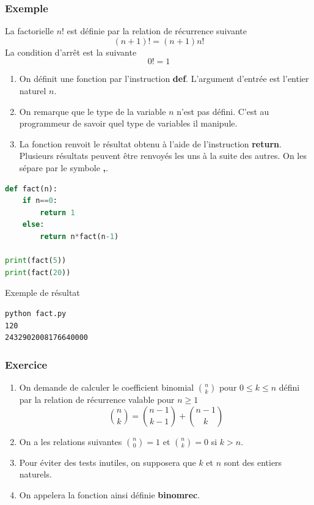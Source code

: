 \documentclass[a4paper,12pt]{article}
\begin{document}
\subsubsection{Exemple}
\begin{leftbar}
La factorielle $n!$ est d\'efinie par la relation de  r\'ecurrence suivante
\begin{equation*}
(n+1)!=(n+1)n!
\end{equation*}
La condition d'arr\^et est la suivante
\begin{equation*}
0!=1
\end{equation*}
\end{leftbar}
\begin{enumerate}
\item On définit une fonction par l'instruction \textbf{def}. L'argument d'entrée est l'entier naturel $n$.
\item On remarque que le type de la variable $n$ n'est pas défini. C'est au programmeur de savoir quel type de variables il manipule.
\item La fonction renvoit le résultat obtenu à l'aide de l'instruction \textbf{return}. Plusieurs résultats peuvent être renvoyés les uns à la suite des autres. On les sépare par le symbole \textbf{,}.
\end{enumerate} 
\begin{lstlisting}[language={Python}]
def fact(n):
    if n==0:
        return 1
    else:
        return n*fact(n-1)

print(fact(5))
print(fact(20))
\end{lstlisting}
Exemple de r\'esultat
\begin{verbatim}
python fact.py 
120
2432902008176640000
\end{verbatim}

\subsubsection{Exercice}
\begin{leftbar}
\begin{enumerate}
\item On demande de calculer le coefficient binomial $\displaystyle\binom{n}{k}$ pour $0\leq k\leq n$ défini par la relation de récurrence valable pour $n\geq 1$
\begin{equation}
\displaystyle\binom{n}{k}=\binom{n-1}{k-1}+\binom{n-1}{k}
\end{equation}
\item On a les relations suivantes $\displaystyle\binom{n}{0}=1$ et $\displaystyle\binom{n}{k}=0$ si $k>n$. 
\item Pour éviter des tests inutiles, on supposera que $k$ et $n$ sont des entiers naturels.
\item On appelera la fonction ainsi définie \textbf{binomrec}.
\end{enumerate}
\end{leftbar}
\end{document}
